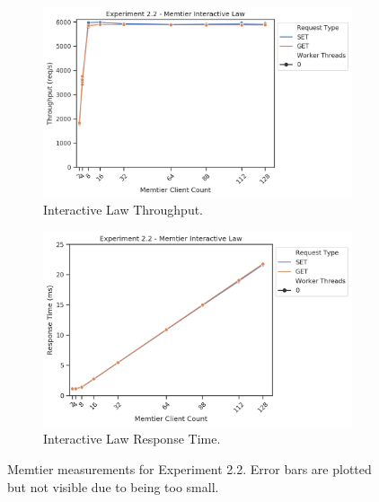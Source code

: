 \begin{figure}
{                \begin{subfigure}[t!]{0.55\textwidth}
                    \centering
                    \includegraphics[width=\textwidth]{../data_analysis/figures/2-2_mt_throughput-il.png}
                    \caption{Interactive Law \textendash{} Throughput.\label{fig:22_mt_tp_il}}
                \end{subfigure}
                \begin{subfigure}[t!]{0.55\textwidth}
                    \centering
                    \includegraphics[width=\textwidth]{../data_analysis/figures/2-2_mt_response-time-il.png}
                    \caption{Interactive Law \textendash{} Response Time.\label{fig:22_mt_rt_il}}
                \end{subfigure}
            }
            \caption{Memtier measurements for Experiment 2.2. Error bars are plotted but not visible due to being too
                     small.\label{fig:21_all}}
        \end{figure}

